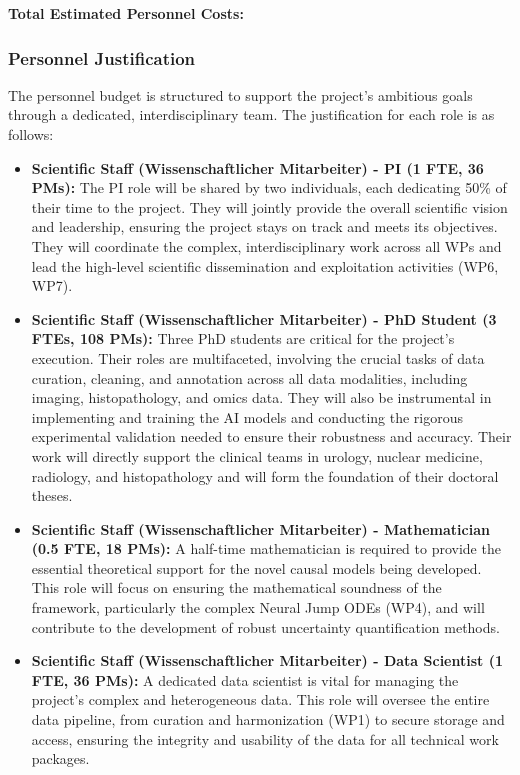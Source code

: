 \textbf{Total Estimated Personnel Costs: }

\subsubsection*{Personnel Justification}
The personnel budget is structured to support the project's ambitious goals through a dedicated, interdisciplinary team. The justification for each role is as follows:
\begin{itemize}
    \item \textbf{Scientific Staff (Wissenschaftlicher Mitarbeiter) - PI (1 FTE, 36 PMs):} The PI role will be shared by two individuals, each dedicating 50\% of their time to the project. They will jointly provide the overall scientific vision and leadership, ensuring the project stays on track and meets its objectives. They will coordinate the complex, interdisciplinary work across all WPs and lead the high-level scientific dissemination and exploitation activities (WP6, WP7).
    \item \textbf{Scientific Staff (Wissenschaftlicher Mitarbeiter) - PhD Student (3 FTEs, 108 PMs):} Three PhD students are critical for the project's execution. Their roles are multifaceted, involving the crucial tasks of data curation, cleaning, and annotation across all data modalities, including imaging, histopathology, and omics data. They will also be instrumental in implementing and training the AI models and conducting the rigorous experimental validation needed to ensure their robustness and accuracy. Their work will directly support the clinical teams in urology, nuclear medicine, radiology, and histopathology and will form the foundation of their doctoral theses.
    \item \textbf{Scientific Staff (Wissenschaftlicher Mitarbeiter) - Mathematician (0.5 FTE, 18 PMs):} A half-time mathematician is required to provide the essential theoretical support for the novel causal models being developed. This role will focus on ensuring the mathematical soundness of the framework, particularly the complex Neural Jump ODEs (WP4), and will contribute to the development of robust uncertainty quantification methods.
    \item \textbf{Scientific Staff (Wissenschaftlicher Mitarbeiter) - Data Scientist (1 FTE, 36 PMs):} A dedicated data scientist is vital for managing the project's complex and heterogeneous data. This role will oversee the entire data pipeline, from curation and harmonization (WP1) to secure storage and access, ensuring the integrity and usability of the data for all technical work packages.

\end{itemize}
